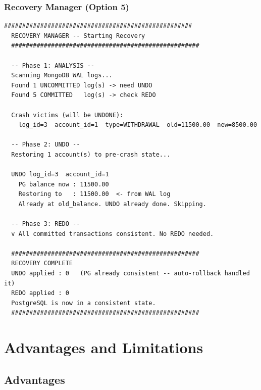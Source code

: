 \subsection{Recovery Manager (Option 5)}

\begin{lstlisting}[style=jsonstyle, caption={Recovery Manager terminal output}]
  ####################################################
  RECOVERY MANAGER -- Starting Recovery
  ####################################################

  -- Phase 1: ANALYSIS --
  Scanning MongoDB WAL logs...
  Found 1 UNCOMMITTED log(s) -> need UNDO
  Found 5 COMMITTED   log(s) -> check REDO

  Crash victims (will be UNDONE):
    log_id=3  account_id=1  type=WITHDRAWAL  old=11500.00  new=8500.00

  -- Phase 2: UNDO --
  Restoring 1 account(s) to pre-crash state...

  UNDO log_id=3  account_id=1
    PG balance now : 11500.00
    Restoring to   : 11500.00  <- from WAL log
    Already at old_balance. UNDO already done. Skipping.

  -- Phase 3: REDO --
  v All committed transactions consistent. No REDO needed.

  ####################################################
  RECOVERY COMPLETE
  UNDO applied : 0   (PG already consistent -- auto-rollback handled it)
  REDO applied : 0
  PostgreSQL is now in a consistent state.
  ####################################################
\end{lstlisting}

\chapter{Advantages and Limitations}

\section{Advantages}

